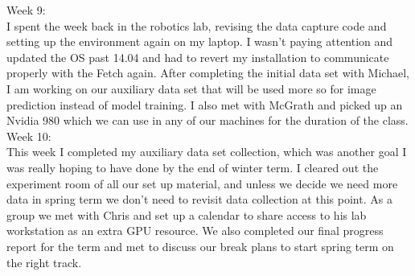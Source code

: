 \documentclass[draftclsnofoot, onecolumn, 10pt, compsoc]{IEEEtran}
\begin{document}
    	Week 9: \\ \indent I spent the week back in the robotics lab, revising the data capture code and setting up the environment again on my laptop. I wasn't paying attention and updated the OS past 14.04 and had to revert my installation to communicate properly with the Fetch again. After completing the initial data set with Michael, I am working on our auxiliary data set that will be used more so for image prediction instead of model training. I also met with McGrath and picked up an Nvidia 980 which we can use in any of our machines for the duration of the class. \\
    	Week 10: \\ \indent This week I completed my auxiliary data set collection, which was another goal I was really hoping to have done by the end of winter term.  I cleared out the experiment room of all our set up material, and unless we decide we need more data in spring term we don't need to revisit data collection at this point. As a group we met with Chris and set up a calendar to share access to his lab workstation as an extra GPU resource. We also completed our final progress report for the term and met to discuss our break plans to start spring term on the right track. \\
        
\end{document}
